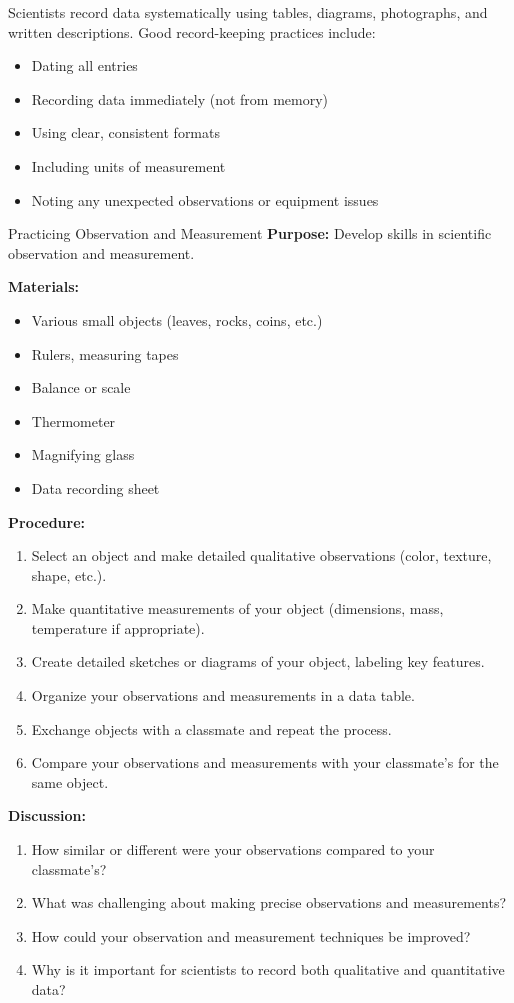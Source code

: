 Scientists record data systematically using tables, diagrams, photographs, and written descriptions. Good record-keeping practices include:

\begin{itemize}
    \item Dating all entries
    \item Recording data immediately (not from memory)
    \item Using clear, consistent formats
    \item Including units of measurement
    \item Noting any unexpected observations or equipment issues
\end{itemize}

\begin{investigation}{Practicing Observation and Measurement}
\textbf{Purpose:} Develop skills in scientific observation and measurement.

\textbf{Materials:}
\begin{itemize}
    \item Various small objects (leaves, rocks, coins, etc.)
    \item Rulers, measuring tapes
    \item Balance or scale
    \item Thermometer
    \item Magnifying glass
    \item Data recording sheet
\end{itemize}

\textbf{Procedure:}
\begin{enumerate}
    \item Select an object and make detailed qualitative observations (color, texture, shape, etc.).
    \item Make quantitative measurements of your object (dimensions, mass, temperature if appropriate).
    \item Create detailed sketches or diagrams of your object, labeling key features.
    \item Organize your observations and measurements in a data table.
    \item Exchange objects with a classmate and repeat the process.
    \item Compare your observations and measurements with your classmate's for the same object.
\end{enumerate}

\textbf{Discussion:}
\begin{enumerate}
    \item How similar or different were your observations compared to your classmate's?
    \item What was challenging about making precise observations and measurements?
    \item How could your observation and measurement techniques be improved?
    \item Why is it important for scientists to record both qualitative and quantitative data?
\end{enumerate}
\end{investigation}

